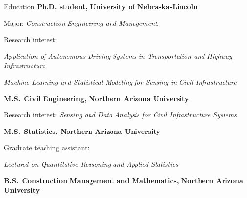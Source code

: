 \begin{rubric}{Education}
\entry*[2022 -- current]%
	\textbf{Ph.D. student, University of Nebraska-Lincoln}
	\par Major: \emph{Construction Engineering and Management.}
	\par Research interest:
	\par \emph{Application of Autonomous Driving Systems in Transportation and Highway Infrastructure}
	\par  \emph{Machine Learning and Statistical Modeling for Sensing in Civil Infrastructure}

%
\entry*[2019 -- 2021]%
	\textbf{M.S.~Civil Engineering, Northern Arizona University}
	\par Research interest: \emph{Sensing and Data Analysis for Civil Infrastructure Systems}

%
\entry*[2017 -- 2019]%
	\textbf{M.S.~Statistics, Northern Arizona University}
	\par Graduate teaching assistant:
	\par \emph{Lectured on Quantitative Reasoning and Applied Statistics}

%
\entry*[2012 -- 2016]%
	\textbf{B.S.~Construction Management and Mathematics, Northern Arizona University}
	\par

\end{rubric}
